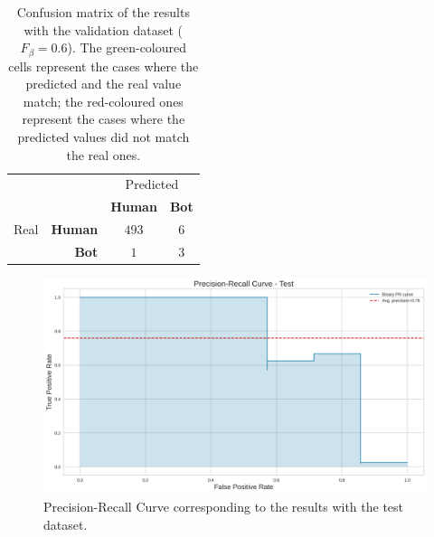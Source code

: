 \documentclass[a4paper, 12pt]{book}
\begin{document}
\begin{table}[tb]
\renewcommand{\arraystretch}{1.5}
\begin{center}
\begin{tabular}{ l r c c }
\toprule
      &                & \multicolumn{2}{c}{Predicted} \tabularnewline
      &                & \textbf{Human}              & \textbf{Bot} \\
                         
 Real & \textbf{Human} & \cellcolor[HTML]{67FD9A} $493$ & \cellcolor[HTML]{FD6864} $6$ \\ %
      & \textbf{Bot}   & \cellcolor[HTML]{FD6864} $1$   & \cellcolor[HTML]{67FD9A} $3$  \\ %
\bottomrule
\end{tabular}
\caption{Confusion matrix of the results with the validation dataset ($F_{\beta} = 0.6$). The green-coloured cells represent the cases where the predicted and the real value match; the red-coloured ones represent the cases where the predicted values did not match the real ones.}
\label{table:confusion-matrix-val}
\end{center}
\end{table}


\begin{figure}
 \centering
  \includegraphics[width=16cm, keepaspectratio]{img/prec-rec-curve-test.png}
  \caption{Precision-Recall Curve corresponding to the results with the test dataset.}
  \label{fig:prec-rec-test}
\end{figure}
\end{document}
